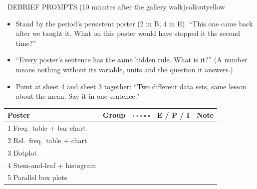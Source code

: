 \documentclass[11pt]{article}
\begin{document}
\begin{callout}{\IconSpeak\ DEBRIEF PROMPTS (10 minutes after the gallery walk)}{calloutyellow}
\begin{itemize}[leftmargin=1.4em,itemsep=2pt]
  \item Stand by the period's persistent poster (2 in B, 4 in E). ``This one came back after we taught it. What on this poster would have stopped it the second time?''
  \item ``Every poster's sentence has the same hidden rule. What is it?'' (A number means nothing without its variable, units and the question it answers.)
  \item Point at sheet 4 and sheet 3 together: ``Two different data sets, same lesson about the mean. Say it in one sentence.''
\end{itemize}
\end{callout}

\begin{center}\small
\begin{tabular}{|p{1.8in}|p{1.2in}|p{1.0in}|p{0.7in}|p{1.5in}|}\hline
\textbf{Poster} & \textbf{Group} & $\square\ \square\ \square\ \square\ \square$ & \textbf{E / P / I} & \textbf{Note} \\ \hline
1 Freq.\ table + bar chart & & & & \\[34pt] \hline
2 Rel.\ freq.\ table + chart & & & & \\[34pt] \hline
3 Dotplot & & & & \\[34pt] \hline
4 Stem-and-leaf + histogram & & & & \\[34pt] \hline
5 Parallel box plots & & & & \\[34pt] \hline
\end{tabular}
\end{center}

\newpage

\end{document}
